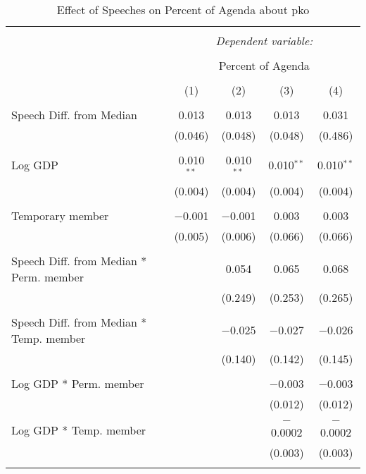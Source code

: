 
\begin{table}[!htbp] \centering 
  \caption{Effect of Speeches on Percent of Agenda about pko} 
  \label{} 
\begin{tabular}{@{\extracolsep{5pt}}lcccc} 
\\[-1.8ex]\hline 
\hline \\[-1.8ex] 
 & \multicolumn{4}{c}{\textit{Dependent variable:}} \\ 
\cline{2-5} 
\\[-1.8ex] & \multicolumn{4}{c}{Percent of Agenda} \\ 
\\[-1.8ex] & (1) & (2) & (3) & (4)\\ 
\hline \\[-1.8ex] 
 Speech Diff. from Median & 0.013 & 0.013 & 0.013 & 0.031 \\ 
  & (0.046) & (0.048) & (0.048) & (0.486) \\ 
  & & & & \\ 
 Log GDP & 0.010$^{**}$ & 0.010$^{**}$ & 0.010$^{**}$ & 0.010$^{**}$ \\ 
  & (0.004) & (0.004) & (0.004) & (0.004) \\ 
  & & & & \\ 
 Temporary member & $-$0.001 & $-$0.001 & 0.003 & 0.003 \\ 
  & (0.005) & (0.006) & (0.066) & (0.066) \\ 
  & & & & \\ 
 Speech Diff. from Median * Perm. member &  & 0.054 & 0.065 & 0.068 \\ 
  &  & (0.249) & (0.253) & (0.265) \\ 
  & & & & \\ 
 Speech Diff. from Median * Temp. member &  & $-$0.025 & $-$0.027 & $-$0.026 \\ 
  &  & (0.140) & (0.142) & (0.145) \\ 
  & & & & \\ 
 Log GDP * Perm. member &  &  & $-$0.003 & $-$0.003 \\ 
  &  &  & (0.012) & (0.012) \\ 
  & & & & \\ 
 Log GDP * Temp. member &  &  & $-$0.0002 & $-$0.0002 \\ 
  &  &  & (0.003) & (0.003) \\ 
  & & & & \\ 

\end{tabular}
\end{table}
